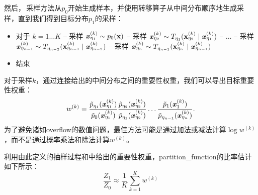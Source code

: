 然后，\,采样方法从$p_0$开始生成样本，并使用转移算子从中间分布顺序地生成采样，直到我们得到目标分布$p_1$的采样：
\begin{itemize}
	\item 对于 $k=1 \dots K$ 
		\newline
		\quad\quad -- 采样 $ \boldsymbol{\mathit{x}}_{\eta_1}^{(k)} \sim p_0(\mathbf{x}) $
		\newline
		\quad\quad -- 采样 $ \boldsymbol{\mathit{x}}_{\eta_2}^{(k)} \sim T_{\eta_1}(\mathbf{x}_{\eta_2}^{(k)} \mid \boldsymbol{\mathit{x}}_{\eta_1}^{(k)} ) $
		\newline
		\quad\quad -- $\dots$
		\newline
		\quad\quad -- 采样 $ \boldsymbol{\mathit{x}}_{\eta_{n-1}}^{(k)} \sim T_{\eta_{n-2}}(\mathbf{x}_{\eta_{n-1}}^{(k)} \mid \boldsymbol{\mathit{x}}_{\eta_{n-2}}^{(k)} ) $
		\newline
		\quad\quad -- 采样 $ \boldsymbol{\mathit{x}}_{\eta_n}^{(k)} \sim T_{\eta_{n-1}}(\mathbf{x}_{\eta_n}^{(k)} \mid \boldsymbol{\mathit{x}}_{\eta_{n-1}}^{(k)} ) $
	\item 结束
\end{itemize}


对于采样$k$，通过连接给出的中间分布之间的重要性权重，我们可以导出目标重要性权重：
\begin{equation}
\label{eq:18.52}
	w^{(k)} = \frac{ \tilde{p}_{\eta_1} ( \boldsymbol{\mathit{x}}_{\eta_1}^{(k)} )  }{  \tilde{p}_{0} ( \boldsymbol{\mathit{x}}_{\eta_1}^{(k)} )  }
\frac{ \tilde{p}_{\eta_2} ( \boldsymbol{\mathit{x}}_{\eta_2}^{(k)} )  }{  \tilde{p}_{\eta_1} ( \boldsymbol{\mathit{x}}_{\eta_2}^{(k)} )  }
\dots
\frac{ \tilde{p}_{1} ( \boldsymbol{\mathit{x}}_{1}^{(k)} )  }{  \tilde{p}_{\eta_{n-1}} ( \boldsymbol{\mathit{x}}_{\eta_n}^{(k)} )  } .
\end{equation}
为了避免诸如\gls{overflow}的数值问题，最佳方法可能是通过加法或减法计算$\log w^{(k)}$，而不是通过概率乘法和除法计算$w^{(k)}$。


利用由此定义的抽样过程和中给出的重要性权重，\gls{partition_function}的比率估计如下所示：
\begin{equation}
	\frac{Z_1}{Z_0} \approx \frac{1}{K} \sum_{k=1}^K w^{(k)}
\end{equation}


